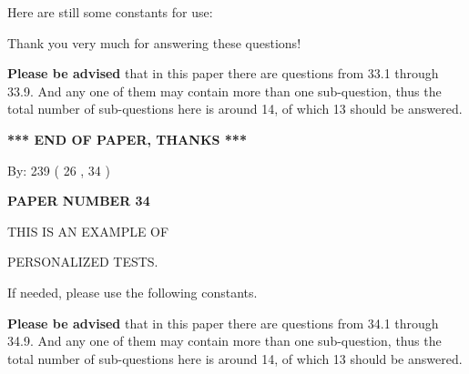 \documentclass[12pt]{article}
\begin{document}
 
 
   
   
 \vspace{0.2in}
Here are still some constants for use:
 
 
 
 
Thank you very much for answering these questions!
 
{\textbf{\large{Please be advised}}} that in this paper there are questions from
33.1 through
33.9.
And any one of them may contain more than one sub-question, thus the total number
of sub-questions here is around 14, of which
13 should be answered.
 
   
   
   
   
\vspace{1.0in} 
{\textbf{\large{ *** END OF PAPER, THANKS *** }}} 
   
   
\hspace{1.0in} By: 
         239 (          26 ,           34 )
   
   
   
   
\newpage 
\setcounter{page}{ 
    34001 } 
   
   
   
   
 {\textbf{ \Large{ PAPER NUMBER           34  }}}
   
   
\vspace{0.2in}
   
   
   
   
   
   
 \vspace{0.2in}
 
 
{\Huge  THIS IS AN EXAMPLE OF}
 
{\Huge  PERSONALIZED TESTS. }
 
If needed, please use the following constants.
 
 
 
{\textbf{\large{Please be advised}}} that in this paper there are questions from
34.1 through
34.9.
And any one of them may contain more than one sub-question, thus the total number
of sub-questions here is around 14, of which
13 should be answered.
 
\vspace{0.3in}
 
 
   
   
  
\vspace{0.2in}
  
\end{document}
